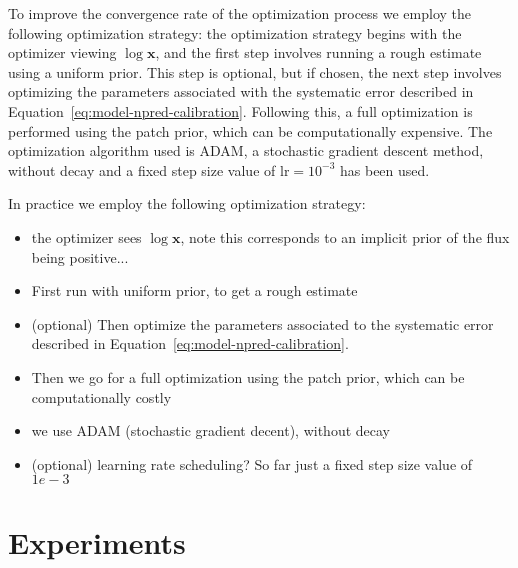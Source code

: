 \documentclass[twocolumn]{aastex631}
\begin{document}
    To improve the convergence rate of the optimization process we employ the following optimization strategy: the optimization strategy begins with the optimizer viewing $\log{\mathbf{x}}$, and the first step involves running a rough estimate using a uniform prior. This step is optional, but if chosen, the next step involves optimizing the parameters associated with the systematic error described in Equation~\ref{eq:model-npred-calibration}. Following this, a full optimization is performed using the patch prior, which can be computationally expensive. The optimization algorithm used is ADAM\citep{Kingma2014}, a stochastic gradient descent method, without decay and a fixed step size value of $\mathrm{lr}=10^{-3}$ has been used.
    
    In practice we employ the following optimization strategy:
    \begin{itemize}
        \item the optimizer sees $\log{\mathbf{x}}$, note this corresponds to an implicit prior of the flux being positive...
        \item First run with uniform prior, to get a rough estimate
        \item (optional) Then optimize the parameters associated to the systematic error described in Equation~\ref{eq:model-npred-calibration}.
        \item Then we go for a full optimization using the patch prior, which can be computationally costly
        \item we use ADAM (stochastic gradient decent), without decay
        \item  (optional) learning rate scheduling? So far just a fixed step size value of $1e-3$
    \end{itemize}
    
    
        
    \section{Experiments}
\end{document}
